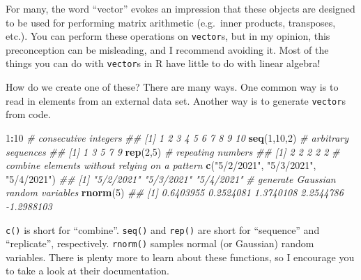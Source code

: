\documentclass[12pt,krantz2]{krantz}
\makeatletter
\newenvironment{Shaded}{\begin{snugshade}}{\end{snugshade}}
\newcommand{\CommentTok}[1]{\textcolor[rgb]{0.37,0.37,0.37}{\textit{#1}}}
\newcommand{\DecValTok}[1]{\textcolor[rgb]{0.06,0.06,0.06}{#1}}
\newcommand{\KeywordTok}[1]{\textcolor[rgb]{0.27,0.27,0.27}{\textbf{#1}}}
\newcommand{\NormalTok}[1]{#1}
\newcommand{\OperatorTok}[1]{\textcolor[rgb]{0.43,0.43,0.43}{\textbf{#1}}}
\newcommand{\StringTok}[1]{\textcolor[rgb]{0.5,0.5,0.5}{#1}}
\newenvironment{kframe}{%
\medskip{}
\setlength{\fboxsep}{.8em}
 \def\at@end@of@kframe{}%
 \ifinner\ifhmode%
  \def\at@end@of@kframe{\end{minipage}}%
  \begin{minipage}{\columnwidth}%
 \fi\fi%
 \def\FrameCommand##1{\hskip\@totalleftmargin \hskip-\fboxsep
 \colorbox{shadecolor}{##1}\hskip-\fboxsep
     \hskip-\linewidth \hskip-\@totalleftmargin \hskip\columnwidth}%
 \MakeFramed {\advance\hsize-\width
   \@totalleftmargin\z@ \linewidth\hsize
   \@setminipage}}%
 {\par\unskip\endMakeFramed%
 \at@end@of@kframe}
\renewenvironment{Shaded}{\begin{kframe}}{\end{kframe}}
\makeatother
\begin{document}
\begin{rmd-caution}
For many, the word ``vector'' evokes an impression that these objects are designed to be used for performing matrix arithmetic (e.g.~inner products, transposes, etc.). You can perform these operations on \texttt{vector}s, but in my opinion, this preconception can be misleading, and I recommend avoiding it. Most of the things you can do with \texttt{vector}s in R have little to do with linear algebra!

\end{rmd-caution}

How do we create one of these? There are many ways. One common way is to read in elements from an external data set. Another way is to generate \texttt{vector}s from code.

\begin{Shaded}
\begin{Highlighting}[]
\DecValTok{1}\OperatorTok{:}\DecValTok{10}         \CommentTok{# consecutive integers}
\CommentTok{##  [1]  1  2  3  4  5  6  7  8  9 10}
\KeywordTok{seq}\NormalTok{(}\DecValTok{1}\NormalTok{,}\DecValTok{10}\NormalTok{,}\DecValTok{2}\NormalTok{)  }\CommentTok{# arbitrary sequences}
\CommentTok{## [1] 1 3 5 7 9}
\KeywordTok{rep}\NormalTok{(}\DecValTok{2}\NormalTok{,}\DecValTok{5}\NormalTok{)     }\CommentTok{# repeating numbers}
\CommentTok{## [1] 2 2 2 2 2}
\CommentTok{# combine elements without relying on a pattern}
\KeywordTok{c}\NormalTok{(}\StringTok{"5/2/2021"}\NormalTok{, }\StringTok{"5/3/2021"}\NormalTok{, }\StringTok{"5/4/2021"}\NormalTok{) }
\CommentTok{## [1] "5/2/2021" "5/3/2021" "5/4/2021"}
\CommentTok{# generate Gaussian random variables}
\KeywordTok{rnorm}\NormalTok{(}\DecValTok{5}\NormalTok{)                             }
\CommentTok{## [1]  0.6403955  0.2524081  1.3740108  2.2544786 -1.2988103}
\end{Highlighting}
\end{Shaded}

\texttt{c()} is short for ``combine''. \texttt{seq()} and \texttt{rep()} are short for ``sequence'' and ``replicate'', respectively. \texttt{rnorm()} samples normal (or Gaussian) random variables. There is plenty more to learn about these functions, so I encourage you to take a look at their documentation.
\end{document}
